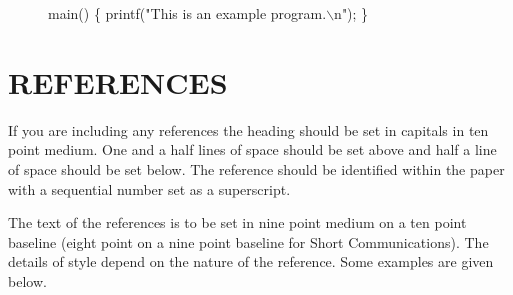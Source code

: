 \begin{figure}[h]
\sf\obeylines
main() \{
\quad printf("This is an example program.$\backslash$n");
\}
\end{figure}

\endappendix

\section*{REFERENCES}

If you are including any references the heading should
be set in capitals in ten point medium. One and a half lines of
space should be set above and half a line of space should be set
below. The reference should be identified within the paper with a
sequential number set as a superscript.\cite{FastCom,UFFS,SPE}

The text of the references is to be set in nine point medium on a ten point
baseline (eight point on a nine point baseline for Short Communications). The
details of style depend on the nature of the reference. Some examples are
given below.




